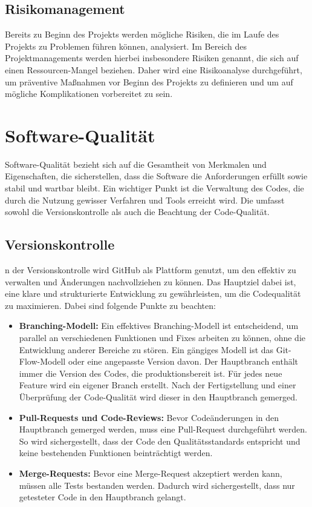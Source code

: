 \documentclass[a4paper,12pt]{article}
\begin{document}
\subsection{Risikomanagement} Bereits zu Beginn des Projekts werden mögliche Risiken, die im Laufe des Projekts zu Problemen führen können, analysiert. Im Bereich des Projektmanagements werden hierbei insbesondere Risiken genannt, die sich auf einen Ressourcen-Mangel beziehen. Daher wird eine Risikoanalyse durchgeführt, um präventive Maßnahmen vor Beginn des Projekts zu definieren und um auf mögliche Komplikationen vorbereitet zu sein.

\section{Software-Qualität}
Software-Qualität bezieht sich auf die Gesamtheit von Merkmalen und Eigenschaften, die sicherstellen, dass die Software die Anforderungen erfüllt sowie stabil und wartbar bleibt. Ein wichtiger Punkt ist die Verwaltung des Codes, die durch die Nutzung gewisser Verfahren und Tools erreicht wird. Die umfasst sowohl die Versionskontrolle als auch die Beachtung der Code-Qualität.

\subsection{Versionskontrolle}
n der Versionskontrolle wird GitHub als Plattform genutzt, um den effektiv zu verwalten und Änderungen nachvollziehen zu können. Das Hauptziel dabei ist, eine klare und strukturierte Entwicklung zu gewährleisten, um die Codequalität zu maximieren. Dabei sind folgende Punkte zu beachten:

\begin{itemize}
    \item \textbf{Branching-Modell:} Ein effektives Branching-Modell ist entscheidend, um parallel an verschiedenen Funktionen und Fixes arbeiten zu können, ohne die Entwicklung anderer Bereiche zu stören. Ein gängiges Modell ist das Git-Flow-Modell oder eine angepasste Version davon. Der Hauptbranch enthält immer die Version des Codes, die produktionsbereit ist. Für jedes neue Feature wird ein eigener Branch erstellt. Nach der Fertigstellung und einer Überprüfung der Code-Qualität wird dieser in den Hauptbranch gemerged.
    \item \textbf{Pull-Requests und Code-Reviews:} Bevor Codeänderungen in den Hauptbranch gemerged werden, muss eine Pull-Request durchgeführt werden. So wird sichergestellt, dass der Code den Qualitätsstandards entspricht und keine bestehenden Funktionen beinträchtigt werden.
    \item \textbf{Merge-Requests:} Bevor eine Merge-Request akzeptiert werden kann, müssen alle Tests bestanden werden. Dadurch wird sichergestellt, dass nur getesteter Code in den Hauptbranch gelangt.
\end{itemize}
\end{document}
